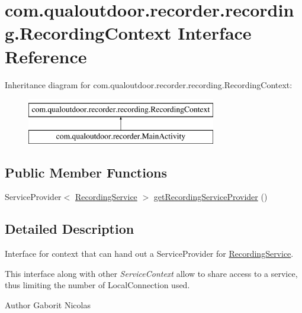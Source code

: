 \hypertarget{interfacecom_1_1qualoutdoor_1_1recorder_1_1recording_1_1RecordingContext}{\section{com.\-qualoutdoor.\-recorder.\-recording.\-Recording\-Context Interface Reference}
\label{interfacecom_1_1qualoutdoor_1_1recorder_1_1recording_1_1RecordingContext}
}
Inheritance diagram for com.\-qualoutdoor.\-recorder.\-recording.\-Recording\-Context\-:\begin{figure}[H]
\begin{center}
\leavevmode
\includegraphics[height=2.000000cm]{interfacecom_1_1qualoutdoor_1_1recorder_1_1recording_1_1RecordingContext}
\end{center}
\end{figure}
\subsection*{Public Member Functions}
\begin{DoxyCompactItemize}
\item 
Service\-Provider$<$ \hyperlink{classcom_1_1qualoutdoor_1_1recorder_1_1recording_1_1RecordingService}{Recording\-Service} $>$ \hyperlink{interfacecom_1_1qualoutdoor_1_1recorder_1_1recording_1_1RecordingContext_a560b42104d884cd2997645172b84dc2b}{get\-Recording\-Service\-Provider} ()
\end{DoxyCompactItemize}


\subsection{Detailed Description}
Interface for context that can hand out a Service\-Provider for \hyperlink{classcom_1_1qualoutdoor_1_1recorder_1_1recording_1_1RecordingService}{Recording\-Service}.

This interface along with other {\itshape Service\-Context} allow to share access to a service, thus limiting the number of Local\-Connection used.

\begin{DoxyAuthor}{Author}
Gaborit Nicolas 
\end{DoxyAuthor}


